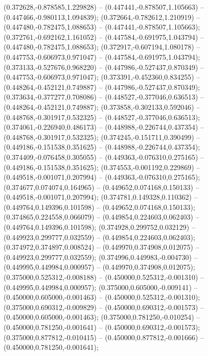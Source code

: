  (0.372628,-0.878585,1.229828) -- (0.447441,-0.878507,1.105663) -- (0.447466,-0.980113,1.094839);
 (0.372664,-0.782612,1.210919) -- (0.447480,-0.782475,1.088653) -- (0.447441,-0.878507,1.105663);
 (0.372761,-0.692162,1.161052) -- (0.447584,-0.691975,1.043794) -- (0.447480,-0.782475,1.088653);
 (0.372917,-0.607194,1.080178) -- (0.447753,-0.606973,0.971047) -- (0.447584,-0.691975,1.043794);
 (0.373133,-0.527676,0.968220) -- (0.447986,-0.527437,0.870349) -- (0.447753,-0.606973,0.971047);
 (0.373391,-0.452360,0.834255) -- (0.448264,-0.452121,0.749887) -- (0.447986,-0.527437,0.870349);
 (0.373634,-0.377277,0.708086) -- (0.448527,-0.377046,0.636513) -- (0.448264,-0.452121,0.749887);
 (0.373858,-0.302133,0.592046) -- (0.448768,-0.301917,0.532325) -- (0.448527,-0.377046,0.636513);
 (0.374061,-0.226940,0.486173) -- (0.448988,-0.226744,0.437354) -- (0.448768,-0.301917,0.532325);
 (0.374245,-0.151711,0.390499) -- (0.449186,-0.151538,0.351625) -- (0.448988,-0.226744,0.437354);
 (0.374409,-0.076458,0.305055) -- (0.449363,-0.076310,0.275165) -- (0.449186,-0.151538,0.351625);
 (0.374553,-0.001192,0.229869) -- (0.449518,-0.001071,0.207994) -- (0.449363,-0.076310,0.275165);
 (0.374677,0.074074,0.164965) -- (0.449652,0.074168,0.150133) -- (0.449518,-0.001071,0.207994);
 (0.374781,0.149328,0.110362) -- (0.449764,0.149396,0.101598) -- (0.449652,0.074168,0.150133);
 (0.374865,0.224558,0.066079) -- (0.449854,0.224603,0.062403) -- (0.449764,0.149396,0.101598);
 (0.374928,0.299752,0.032129) -- (0.449923,0.299777,0.032559) -- (0.449854,0.224603,0.062403);
 (0.374972,0.374897,0.008524) -- (0.449970,0.374908,0.012075) -- (0.449923,0.299777,0.032559);
 (0.374996,0.449983,-0.004730) -- (0.449995,0.449984,0.000957) -- (0.449970,0.374908,0.012075);
 (0.375000,0.525312,-0.008188) -- (0.450000,0.525312,-0.001310) -- (0.449995,0.449984,0.000957);
 (0.375000,0.605000,-0.009141) -- (0.450000,0.605000,-0.001463) -- (0.450000,0.525312,-0.001310);
 (0.375000,0.690312,-0.009829) -- (0.450000,0.690312,-0.001573) -- (0.450000,0.605000,-0.001463);
 (0.375000,0.781250,-0.010254) -- (0.450000,0.781250,-0.001641) -- (0.450000,0.690312,-0.001573);
 (0.375000,0.877812,-0.010415) -- (0.450000,0.877812,-0.001666) -- (0.450000,0.781250,-0.001641);
